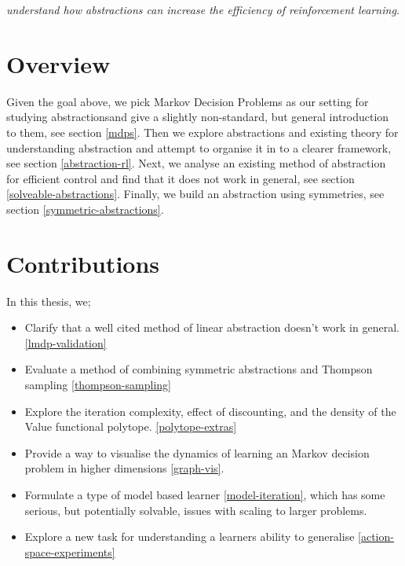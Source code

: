 \begin{displayquote}
\textit{understand how abstractions can increase the efficiency of reinforcement learning.}
\end{displayquote}

\section{Overview}

Given the goal above, we pick Markov Decision Problems as our setting for studying abstractions\footnotemark and give a slightly non-standard, but general introduction to them, see section \ref{mdps}.
Then we explore abstractions and existing theory for understanding abstraction and attempt to organise it in to a clearer framework, see section \ref{abstraction-rl}.
Next, we analyse an existing method of abstraction for efficient control and find that it does not work in general, see section \ref{solveable-abstractions}.
Finally, we build an abstraction using symmetries, see section \ref{symmetric-abstractions}.


\section{Contributions}

In this thesis, we;

\begin{itemize}
  \tightlist
  \item Clarify that a well cited method of linear abstraction doesn't work in general. \ref{lmdp-validation}
  \item Evaluate a method of combining symmetric abstractions and Thompson sampling \ref{thompson-sampling}
  \item Explore the iteration complexity, effect of discounting, and the density of the Value functional polytope. \ref{polytope-extras}
  \item Provide a way to visualise the dynamics of learning an Markov decision problem in higher dimensions \ref{graph-vis}.
  \item Formulate a type of model based learner \ref{model-iteration}, which has some serious, but potentially solvable, issues with scaling to larger problems.
  \item Explore a new task for understanding a learners ability to generalise \ref{action-space-experiments}
\end{itemize}
